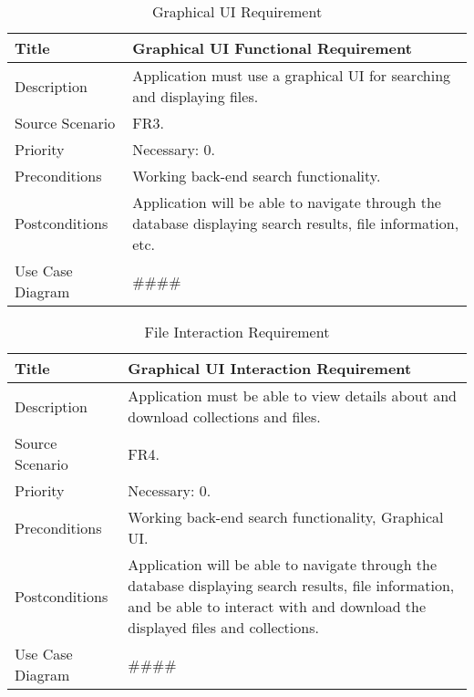 \label{UI Requirements}
\begin{table}[h!]
  \caption{Graphical UI Requirement}
  \label{system-requirements/functional-requirements}
  \begin{tabularx}{\textwidth}{|l|X|}
    \hline
    Title            & Graphical UI Functional Requirement \\ \hline
    Description      & Application must use a graphical UI for searching and 
                       displaying files. \\ \hline
    Source Scenario  & FR3. \\ \hline
    Priority         & Necessary: 0. \\ \hline
    Preconditions    & Working back-end search functionality. \\ \hline
    Postconditions   & Application will be able to navigate through the database
                       displaying search results, file information, etc. \\ \hline
    Use Case Diagram & #### \\ \hline
  \end{tabularx}
\end{table}

\begin{table}[h!]
  \caption{File Interaction Requirement}
  \label{system-requirements/functional-requirements}
  \begin{tabularx}{\textwidth}{|l|X|}
    \hline
    Title            & Graphical UI Interaction Requirement \\ \hline
    Description      & Application must be able to view details about and
                       download collections and files. \\ \hline
    Source Scenario  & FR4. \\ \hline
    Priority         & Necessary: 0. \\ \hline
    Preconditions    & Working back-end search functionality, Graphical UI. \\ \hline
    Postconditions   & Application will be able to navigate through the database
                       displaying search results, file information, and be able to 
                       interact with and download the displayed files and 
                       collections. \\ \hline
    Use Case Diagram & #### \\ \hline
  \end{tabularx}
\end{table}

